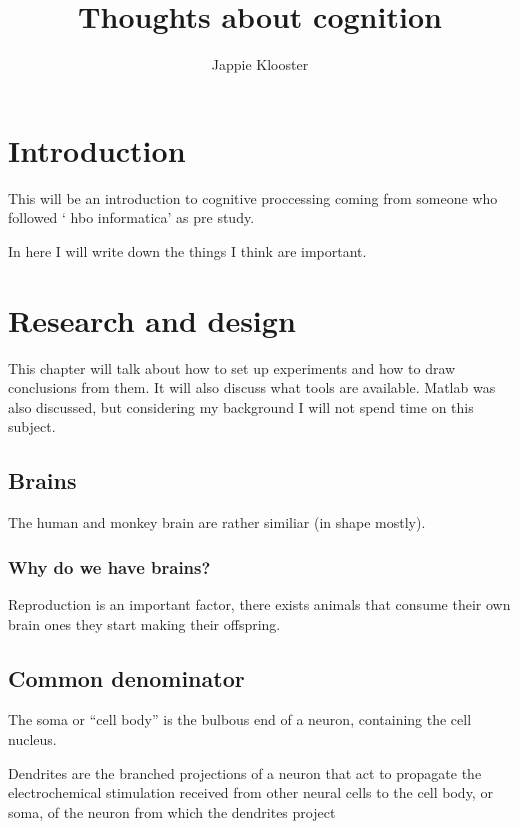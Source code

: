 \documentclass{article}
\begin{document}
\lstset{language=Java}
\author{Jappie Klooster}
\title{Thoughts about cognition}
\maketitle

\section{Introduction}
This will be an introduction to cognitive proccessing
coming from someone who followed
` hbo informatica' as pre study.

In here I will write down the things I think are important.

\section{Research and design}
This chapter will talk about how to set up experiments and how to draw
conclusions from them. It will also discuss what tools are available.
Matlab was also discussed, but considering my background I will not spend
time on this subject.

\subsection{Brains}
The human and monkey brain are rather similiar (in shape mostly).

\subsubsection{Why do we have brains?}
Reproduction is an important factor, there exists animals that consume their
own brain ones they start making their offspring.

\subsection{Common denominator}
The soma or ``cell body'' is the bulbous end of a
neuron, containing the cell nucleus.

Dendrites are the branched projections of a neuron that act to
propagate the electrochemical stimulation received from other neural
cells to the cell body, or soma, of the neuron from which the
dendrites project
\end{document}

